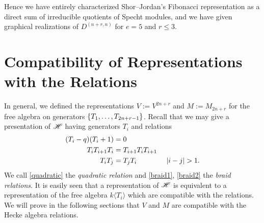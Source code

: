 \documentclass{amsart}
\begin{document}
Hence we have entirely characterized Shor--Jordan's Fibonacci representation \cite{Shor} as a direct sum of irreducible quotients of Specht modules, and we have given graphical realizations of $D^{(n+r,n)}$ for $e = 5$ and $r \leq 3$.

\newpage
\appendix
\section{Compatibility of Representations with the Relations}\label{Compatibility Section}
In general, we defined the representations $V := V^{2n + r}$ and $M := M_{2n + r}$ for the free algebra on generators $\left\{ T_1,\dots,T_{2n + r - 1} \right\}$.
Recall that we may give a presentation of $\mathscr{H}$ having generators $T_i$ and relations
\begin{align}
  (T_i - q)(T_i + 1) &= 0 \label{quadratic}\\
  T_iT_{i+1}T_i &= T_{i+1}T_iT_{i+1} \label{braid1}\\ 
  T_iT_j &= T_jT_i \hspace{40pt} \left| i - j \right| > 1. \label{braid2}
\end{align}
We call \eqref{quadratic} the \emph{quadratic relation} and \eqref{braid1}, \eqref{braid2} the \emph{braid relations}.
It is easily seen that a representation of $\mathscr{H}$ is equivalent to a representation of the free algebra $k\langle T_i \rangle$ which are compatible with the relations.
We will prove in the following sections that $V$ and $M$ are compatible with the Hecke algebra relations.
\end{document}
